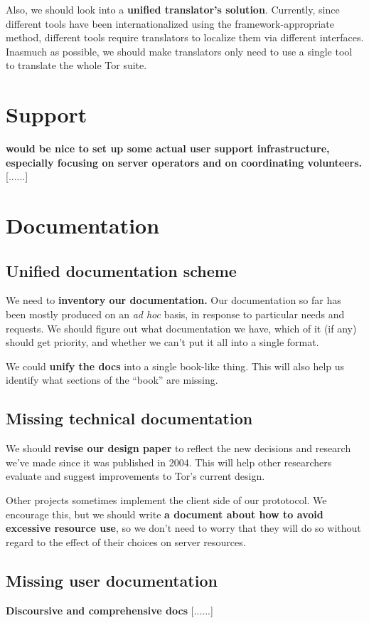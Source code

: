 \documentclass{article}
\newcommand{\tmp}[1]{{\bf #1} [......] \\}
\begin{document}

Also, we should look into a {\bf unified translator's solution}.  Currently,
since different tools have been internationalized using the
framework-appropriate method, different tools require translators to localize
them via different interfaces.  Inasmuch as possible, we should make
translators only need to use a single tool to translate the whole Tor suite.

\section{Support}

\tmp{would be nice to set up some actual user support infrastructure, especially
focusing on server operators and on coordinating volunteers.}


\section{Documentation}

\subsection{Unified documentation scheme}

We need to {\bf inventory our documentation.}  Our documentation so far has
been mostly produced on an {\it ad hoc} basis, in response to particular
needs and requests.  We should figure out what documentation we have, which of
it (if any) should get priority, and whether we can't put it all into a
single format.

We could {\bf unify the docs} into a single book-like thing.  This will also
help us identify what sections of the ``book'' are missing.

\subsection{Missing technical documentation}

We should {\bf revise our design paper} to reflect the new decisions and
research we've made since it was published in 2004.  This will help other
researchers evaluate and suggest improvements to Tor's current design.

Other projects sometimes implement the client side of our prototocol.  We
encourage this, but we should write {\bf a document about how to avoid
excessive resource use}, so we don't need to worry that they will do so
without regard to the effect of their choices on server resources.

\subsection{Missing user documentation}

\tmp{Discoursive and comprehensive docs}

 
\end{document}
